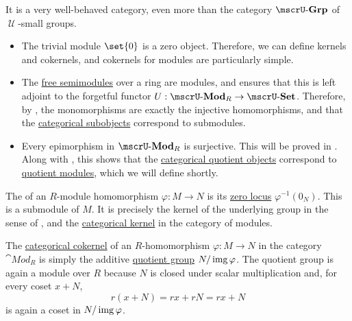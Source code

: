\begin{definition}
\begin{thmenum}
    It is a very well-behaved category, even more than the category \hyperref[def:group/category]{\( \ucat{Grp} \)} of \( \mscrU \)-small groups.
    \begin{itemize}
      \item The trivial module \( \set{ 0 } \) is a zero object. Therefore, we can define kernels and cokernels, and cokernels for modules are particularly simple.

      \item The \hyperref[def:free_semimodule]{free semimodules} over a ring are modules, and  ensures that this is left adjoint to the forgetful functor \( U: \ucat{Mod}_R \to \ucat{Set} \). Therefore, by , the monomorphisms are exactly the injective homomorphisms, and that the \hyperref[def:subobject_and_quotient]{categorical subobjects} correspond to submodules.

      \item Every epimorphism in \( \ucat{Mod}_R \) is surjective. This will be proved in . Along with , this shows that the \hyperref[def:subobject_and_quotient]{categorical quotient objects} correspond to \hyperref[def:module/quotient]{quotient modules}, which we will define shortly.
    \end{itemize}

     The  of an \( R \)-module homomorphism \( \varphi: M \to N \) is its \hyperref[def:zero_locus]{zero locus} \( \varphi^{-1}(0_N) \). This is a submodule of \( M \). It is precisely the kernel of the underlying group in the sense of , and the \hyperref[def:zero_morphisms/cokernel]{categorical kernel} in the category of modules.

     The \hyperref[def:zero_morphisms/cokernel]{categorical cokernel} of an \( R \)-homomorphism \( \varphi: M \to N \) in the category \( \cat{Mod}_R \) is simply the additive \hyperref[def:group/quotient]{quotient group} \( N / \operatorname{img} \varphi \). The quotient group is again a module over \( R \) because \( N \) is closed under scalar multiplication and, for every coset \( x + N \),
    \begin{equation*}
      r(x + N) = rx + rN = rx + N
    \end{equation*}
    is again a coset in \( N / \operatorname{img} \varphi \).


\end{thmenum}
\end{definition}
